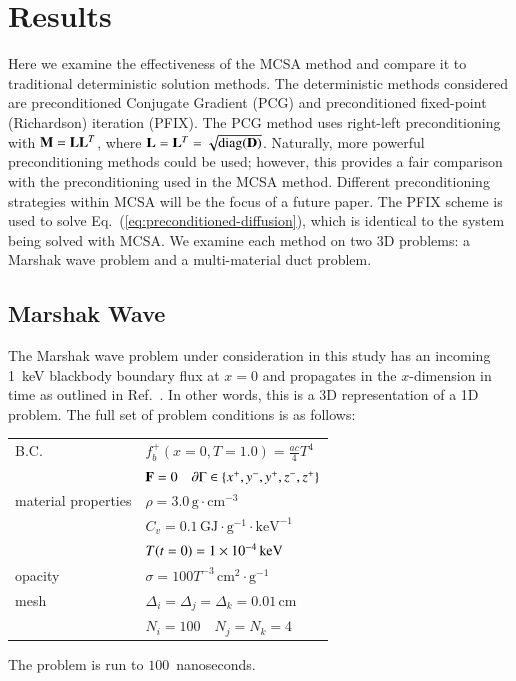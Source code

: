 \documentclass[preprint,12pt]{elsarticle}
\newcommand{\Cv}{\ensuremath{C_{v}}}
\newcommand{\Di}{\ensuremath{\Delta_i}}
\newcommand{\Dj}{\ensuremath{\Delta_j}}
\newcommand{\Dk}{\ensuremath{\Delta_k}}
\DeclareMathOperator{\diag}{diag}
\begin{document}
\section{Results}
\label{sec:results}

Here we examine the effectiveness of the MCSA method and compare it to
traditional deterministic solution methods.  The deterministic methods
considered are preconditioned Conjugate Gradient (PCG) and
preconditioned fixed-point (Richardson) iteration (PFIX).  The PCG
method uses right-left preconditioning with $\mathbf{M}=\mathbf{L}\mathbf{L}^{T}$,
where $\ve{L} = \ve{L}^{T} = \sqrt{\diag(\ve{D})}$.  Naturally, more
powerful preconditioning methods could be used; however, this provides
a fair comparison with the preconditioning used in the MCSA method.
Different preconditioning strategies within MCSA will be the focus of
a future paper.  The PFIX scheme is used to solve
Eq.~(\ref{eq:preconditioned-diffusion}), which is identical to the
system being solved with MCSA.  We examine each method on two 3D
problems: a Marshak wave problem and a multi-material duct problem.

\subsection{Marshak Wave}

The Marshak wave problem under consideration in this study has an incoming
1~keV blackbody boundary flux at $x=0$ and propagates in the $x$-dimension in
time as outlined in Ref.~\cite{larsen_1980}.  In other words, this is a 3D
representation of a 1D problem.  The full set of problem conditions is as
follows:
\begin{center}
  \begin{tabular}{ll}\hline
    B.C. & $f_b^{+}(x=0,T=1.0) = \frac{ac}{4}T^4$ \\ & $\mathbf{F} =
    0\quad \partial\Gamma \in \{x^{+}, y^{-}, y^{+}, z^{-}, z^{+}\}$
    \\ material properties & $\rho =
    3.0\,\text{g}\cdot\text{cm}^{-3}$ \\ & $\Cv =
    0.1\,\text{GJ}\cdot\text{g}^{-1}\cdot\text{keV}^{-1}$\\ &
    $T(t=0) = 1\times 10^{-4}\,\text{keV}$\\  opacity & $\sigma =
    100T^{-3}\,\text{cm}^2\cdot\text{g}^{-1}$ \\  mesh & $\Di = \Dj
    = \Dk = 0.01\,\text{cm}$ \\ & $N_i = 100\quad N_j = N_k = 4$
    \\ \hline
  \end{tabular}
\end{center}
The problem is run to $100$~nanoseconds.
\end{document}
